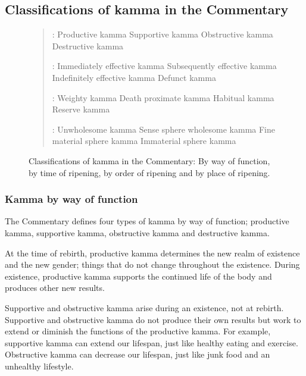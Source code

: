 \pagebreak

\subsection*{Classifications of kamma in the Commentary}

\begin{figure}[H]
\begin{quote}
:  Productive kamma  Supportive kamma  Obstructive kamma  Destructive kamma

:  Immediately effective kamma  Subsequently effective kamma  Indefinitely effective kamma  Defunct kamma

:  Weighty kamma  Death proximate kamma  Habitual kamma  Reserve kamma

:  Unwholesome kamma  Sense sphere wholesome kamma  Fine material sphere kamma  Immaterial sphere kamma

\end{quote}

\caption{Classifications of kamma in the Commentary: By way of function, by time of ripening, by order of ripening and by place of ripening.}
\label{fig:Classifications}
\end{figure}

\subsubsection*{Kamma by way of function}

The Commentary defines four types of kamma by way of function; productive kamma, supportive kamma, obstructive kamma and destructive kamma.

At the time of rebirth, productive kamma determines the new realm of existence and the new gender; things that do not change throughout the existence. During existence, productive kamma supports the continued life of the body and produces other new results.

Supportive and obstructive kamma arise during an existence, not at rebirth. Supportive and obstructive kamma do not produce their own results but work to extend or diminish the functions of the productive kamma. For example, supportive kamma can extend our lifespan, just like healthy eating and exercise. Obstructive kamma can decrease our lifespan, just like junk food and an unhealthy lifestyle.

